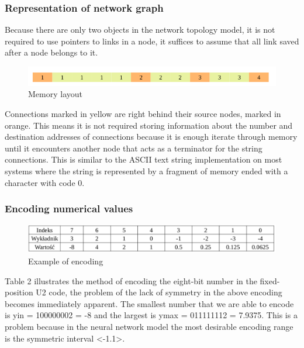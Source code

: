 \documentclass{beamer}
\begin{document}
\begin{frame}
\begin{columns}[T,onlytextwidth]
\begin{column}{.4\textwidth}
\begin{onlyenv}
\begin{minipage}{\textwidth}
\begin{figure}
                    \end{figure}
                \end{minipage}
            \end{onlyenv}
        \end{column}
    \end{columns}
\end{frame}

\begin{frame}
\frametitle{Representation of network graph}
	Because there are only two objects in the network topology model, it is not required
	to use pointers to links in a node, it suffices to assume that all link saved after a node 
	belongs to it.
	\begin{figure}[htb] 
		\includegraphics[width=\textwidth]{figures/in_memo}
		\caption{Memory layout}
	\end{figure}
	Connections marked in yellow are right behind their source nodes, marked in orange. 
	This means it is not required storing information about the number and destination addresses 
	of connections because it is enough iterate through memory until it encounters another node 
	that acts as a terminator for the string connections.
	This is similar to the ASCII text string implementation on most systems where the string is 
	represented by a fragment of memory ended with a character with code 0.
\end{frame}

\begin{frame}
\frametitle{Encoding numerical values}
	\begin{figure}[htb] 
		\includegraphics[width=\textwidth]{figures/u2_example}
		\caption{Example of encoding}
	\end{figure}
	Table 2 illustrates the method of encoding the eight-bit number in the fixed-position U2 code,
	the problem of the lack of symmetry in the above encoding becomes immediately apparent.
	The smallest number that we are able to encode is yin = 100000002 = -8 and the largest is 
	ymax = 011111112 = 7.9375.
	This is a problem because in the neural network model the most desirable encoding range is 
	the symmetric interval <-1.1>. 
\end{frame}
\end{document}
